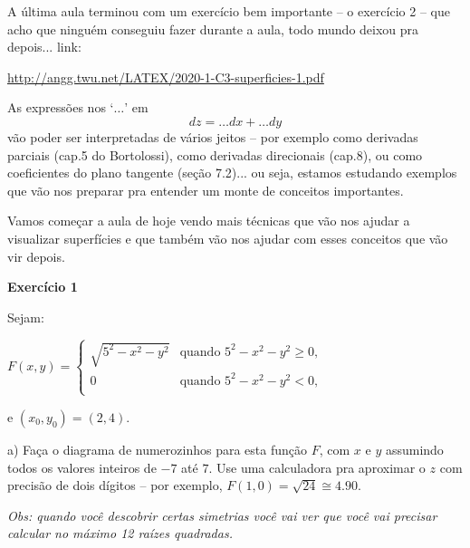 \documentclass[oneside,12pt]{article}
\begin{document}
A última aula terminou com um exercício bem importante -- o exercício
2 -- que acho que ninguém conseguiu fazer durante a aula, todo mundo
deixou pra depois... link:


\ssk

\url{http://angg.twu.net/LATEX/2020-1-C3-superficies-1.pdf}

\msk

As expressões nos `$\ldots$' em
%
$$dz = \ldots dx + \ldots dy$$
%
vão poder ser interpretadas de vários jeitos -- por exemplo como
derivadas parciais (cap.5 do Bortolossi), como derivadas direcionais
(cap.8), ou como coeficientes do plano tangente (seção 7.2)... ou
seja, estamos estudando exemplos que vão nos preparar pra entender um
monte de conceitos importantes.

Vamos começar a aula de hoje vendo mais técnicas que vão nos ajudar a
visualizar superfícies e que também vão nos ajudar com esses conceitos
que vão vir depois.

\newpage


{\bf Exercício 1}

\ssk

Sejam:

$ F(x,y) =
\begin{cases}
  \sqrt{5^2 - x^2 - y^2} & \text{quando $5^2 - x^2 - y^2≥0$}, \\
  0 & \text{quando $5^2 - x^2 - y^2<0$,} \\
 \end{cases}
$

e $(x_0,y_0)=(2,4)$.

\msk

a) Faça o diagrama de numerozinhos para esta função $F$, com $x$ e $y$
assumindo todos os valores inteiros de $-7$ até $7$. Use uma
calculadora pra aproximar o $z$ com precisão de dois dígitos -- por
exemplo, $F(1,0) = \sqrt{24} ≅ 4.90$.

\msk

{\sl Obs: quando você descobrir certas simetrias você vai ver que você
  vai precisar calcular no máximo 12 raízes quadradas.}

\newpage

\end{document}

